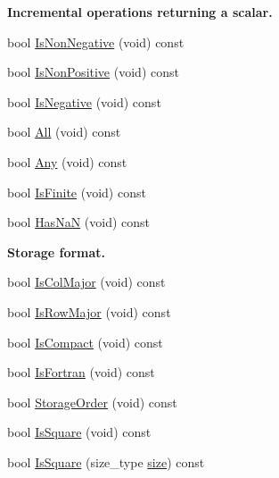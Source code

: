 \begin{Indent}{\bf Incremental operations returning a scalar.}
\begin{DoxyCompactItemize}
bool \hyperlink{classvct_dynamic_const_matrix_base_a781a40222ec60af886e5b0dc4b768bdc}{Is\+Non\+Negative} (void) const 
\item 
bool \hyperlink{classvct_dynamic_const_matrix_base_aece7c6ee08d3d9096b047dd76652a275}{Is\+Non\+Positive} (void) const 
\item 
bool \hyperlink{classvct_dynamic_const_matrix_base_a35aead8228fd239ea3b00802bdb5d95d}{Is\+Negative} (void) const 
\item 
bool \hyperlink{classvct_dynamic_const_matrix_base_a13617153241ba117e3585100211e9a0c}{All} (void) const 
\item 
bool \hyperlink{classvct_dynamic_const_matrix_base_a6a0a1c4a4e8119f62f97b246f5ce561d}{Any} (void) const 
\item 
bool \hyperlink{classvct_dynamic_const_matrix_base_a265590c5faf2d7ebc433a0d6aadfec91}{Is\+Finite} (void) const 
\item 
bool \hyperlink{classvct_dynamic_const_matrix_base_adf2612e64481a697ae8a9fc78e2e07f2}{Has\+Na\+N} (void) const 
\end{DoxyCompactItemize}
\end{Indent}
\begin{Indent}{\bf Storage format.}\par
\begin{DoxyCompactItemize}
\item 
bool \hyperlink{classvct_dynamic_const_matrix_base_a1945a7e96b8b050638207fc3da099a57}{Is\+Col\+Major} (void) const 
\item 
bool \hyperlink{classvct_dynamic_const_matrix_base_a8683251574604778a9e3c147d33b4539}{Is\+Row\+Major} (void) const 
\item 
bool \hyperlink{classvct_dynamic_const_matrix_base_ac061c634b765bbd24e2772375c4578a1}{Is\+Compact} (void) const 
\item 
bool \hyperlink{classvct_dynamic_const_matrix_base_aac5f19015b4888f760f99daa4bac199c}{Is\+Fortran} (void) const 
\item 
bool \hyperlink{classvct_dynamic_const_matrix_base_a064405adc7355f3fc8539f01ed4ea6d4}{Storage\+Order} (void) const 
\item 
bool \hyperlink{classvct_dynamic_const_matrix_base_ac2d09b31112bdc2535fec493232015e4}{Is\+Square} (void) const 
\item 
bool \hyperlink{classvct_dynamic_const_matrix_base_ad74a461c722bf9c2e1b9aaa85049f327}{Is\+Square} (size\+\_\+type \hyperlink{classvct_dynamic_const_matrix_base_ab9d484f83471aee6512ea614aa54bd0b}{size}) const 
\end{DoxyCompactItemize}
\end{Indent}
